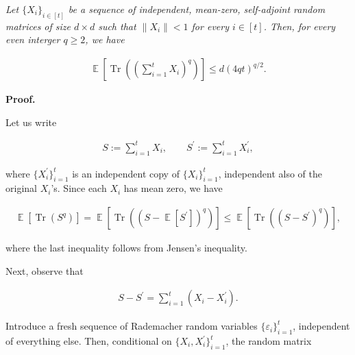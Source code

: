 \documentclass[10pt,a4paper]{article}
\begin{document}
\emph{Let $\{X_{i}\}_{i\in[t]}$ be a sequence of independent, mean-zero, self-adjoint random matrices of size $d\times d$ such that $\|X_{i}\|<1$ for every $i\in[t]$. Then, for every even interger $q\geq 2$, we have}\par


\[\begin{gathered}
\operatorname*{\mathbb{E}}\left[\operatorname*{Tr}\left(\left(\sum_{i=1}^{t}X_{i}\right)^{q}\right)\right]\leq d\left(4qt\right)^{q/2}.
\end{gathered}\]







\par\medskip\noindent\textbf{Proof.}\par




Let us write\par


\[\begin{gathered}
S:=\sum_{i=1}^{t}X_{i},\qquad S^{\prime}:=\sum_{i=1}^{t}X_{i}^{\prime},
\end{gathered}\]


where $\{X_{i}^{\prime}\}_{i=1}^{t}$ is an independent copy of $\{X_{i}\}_{i=1}^{t}$, independent also of the original $X_{i}$’s. Since each $X_{i}$ has mean zero, we have\par


\[\begin{gathered}
\operatorname*{\mathbb{E}}\left[\operatorname*{Tr}\left(S^{q}\right)\right]=\operatorname*{\mathbb{E}}\left[\operatorname*{Tr}\left((S-\operatorname*{\mathbb{E}}[S^{\prime}])^{q}\right)\right]\leq\operatorname*{\mathbb{E}}\left[\operatorname*{Tr}\left((S-S^{\prime})^{q}\right)\right],
\end{gathered}\]


where the last inequality follows from Jensen’s inequality.\par




Next, observe that\par


\[\begin{gathered}
S-S^{\prime}=\sum_{i=1}^{t}\left(X_{i}-X_{i}^{\prime}\right).
\end{gathered}\]


Introduce a fresh sequence of Rademacher random variables $\{\varepsilon_{i}\}_{i=1}^{t}$, independent of everything else. Then, conditional on $\{X_{i},X_{i}^{\prime}\}_{i=1}^{t}$, the random matrix\par
\end{document}
